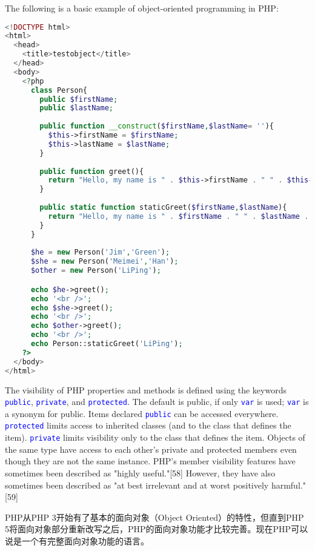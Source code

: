 The following is a basic example of object-oriented programming in PHP:

\begin{lstlisting}[language=PHP]
<!DOCTYPE html>
<html>
  <head>
    <title>testobject</title>
  </head>
  <body>
    <?php
      class Person{
        public $firstName;
        public $lastName;
        
        public function __construct($firstName,$lastName= ''){
          $this->firstName = $firstName;
          $this->lastName = $lastName;
        }
        
        public function greet(){
          return "Hello, my name is " . $this->firstName . " " . $this->lastName . ".";
        }
        
        public static function staticGreet($firstName,$lastName){
          return "Hello, my name is " . $firstName . " " . $lastName . "."; 
        }
      }
      
      $he = new Person('Jim','Green');
      $she = new Person('Meimei','Han');
      $other = new Person('LiPing');

      echo $he->greet();
      echo '<br />';
      echo $she->greet();
      echo '<br />';
      echo $other->greet();
      echo '<br />';
      echo Person::staticGreet('LiPing');
    ?>
  </body>
</html>
\end{lstlisting}

The visibility of PHP properties and methods is defined using the keywords \textcolor{Blue}{\texttt{public}}, \textcolor{Blue}{\texttt{private}}, and \textcolor{Blue}{\texttt{protected}}. The default is public, if only \textcolor{Blue}{\texttt{var}} is used; \textcolor{Blue}{\texttt{var}} is a synonym for public. Items declared \textcolor{Blue}{\texttt{public}} can be accessed everywhere. \textcolor{Blue}{\texttt{protected}} limits access to inherited classes (and to the class that defines the item). \textcolor{Blue}{\texttt{private}} limits visibility only to the class that defines the item. Objects of the same type have access to each other's private and protected members even though they are not the same instance. PHP's member visibility features have sometimes been described as "highly useful."[58] However, they have also sometimes been described as "at best irrelevant and at worst positively harmful."[59]


PHP从PHP 3开始有了基本的面向对象（Object Oriented）的特性，但直到PHP 5将面向对象部分重新改写之后，PHP的面向对象功能才比较完善。现在PHP可以说是一个有完整面向对象功能的语言。

